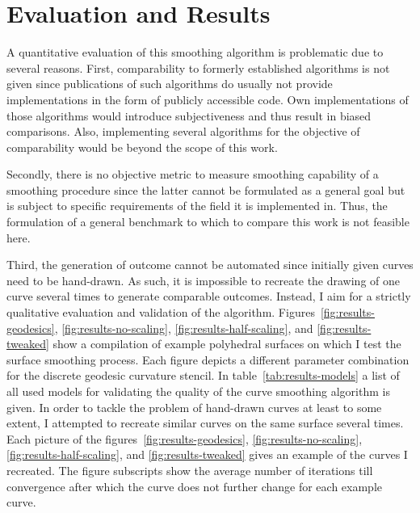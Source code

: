 \documentclass{stdlocal}
\begin{document}
\section{Evaluation and Results} %
\label{sec:evaluation}


A quantitative evaluation of this smoothing algorithm is problematic due to several reasons.
First, comparability to formerly established algorithms is not given since publications of such algorithms do usually not provide implementations in the form of publicly accessible code.
Own implementations of those algorithms would introduce subjectiveness and thus result in biased comparisons.
Also, implementing several algorithms for the objective of comparability would be beyond the scope of this work.

Secondly, there is no objective metric to measure smoothing capability of a smoothing procedure since the latter cannot be formulated as a general goal but is subject to specific requirements of the field it is implemented in.
Thus, the formulation of a general benchmark to which to compare this work is not feasible here.

Third, the generation of outcome cannot be automated since initially given curves need to be hand-drawn.
As such, it is impossible to recreate the drawing of one curve several times to generate comparable outcomes.
Instead, I aim for a strictly qualitative evaluation and validation of the algorithm.
Figures~\ref{fig:results-geodesics}, \ref{fig:results-no-scaling}, \ref{fig:results-half-scaling}, and \ref{fig:results-tweaked} show a compilation of example polyhedral surfaces on which I test the surface smoothing process.
Each figure depicts a different parameter combination for the discrete geodesic curvature stencil.
In table~\ref{tab:results-models} a list of all used models for validating the quality of the curve smoothing algorithm is given.
In order to tackle the problem of hand-drawn curves at least to some extent, I attempted to recreate similar curves on the same surface several times.
Each picture of the figures~\ref{fig:results-geodesics}, \ref{fig:results-no-scaling}, \ref{fig:results-half-scaling}, and \ref{fig:results-tweaked} gives an example of the curves I recreated.
The figure subscripts show the average number of iterations till convergence after which the curve does not further change for each example curve.
\end{document}

